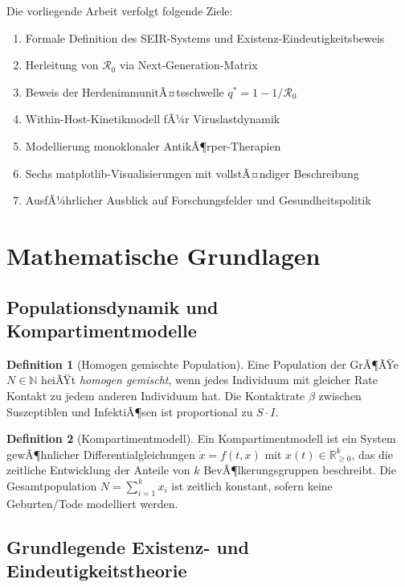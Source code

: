 ﻿\documentclass[12pt,a4paper]{article}
\theoremstyle{definition}
\newtheorem{definition}{Definition}[section]
\theoremstyle{plain}
\theoremstyle{remark}
\newcommand{\NN}{\mathbb{N}}
\newcommand{\RRR}{\mathbb{R}}
\begin{document}
Die vorliegende Arbeit verfolgt folgende Ziele:
\begin{enumerate}
  \item Formale Definition des SEIR-Systems und Existenz-Eindeutigkeitsbeweis
  \item Herleitung von $\mathcal{R}_0$ via Next-Generation-Matrix
  \item Beweis der HerdenimmunitÃ¤tsschwelle $q^* = 1 - 1/\mathcal{R}_0$
  \item Within-Host-Kinetikmodell fÃ¼r Viruslastdynamik
  \item Modellierung monoklonaler AntikÃ¶rper-Therapien
  \item Sechs matplotlib-Visualisierungen mit vollstÃ¤ndiger Beschreibung
  \item AusfÃ¼hrlicher Ausblick auf Forschungsfelder und Gesundheitspolitik
\end{enumerate}

\section{Mathematische Grundlagen}

\subsection{Populationsdynamik und Kompartimentmodelle}

\begin{definition}[Homogen gemischte Population]
Eine Population der GrÃ¶ÃŸe $N \in \NN$ heiÃŸt \emph{homogen gemischt}, wenn jedes
Individuum mit gleicher Rate Kontakt zu jedem anderen Individuum hat.
Die Kontaktrate $\beta$ zwischen Suszeptiblen und InfektiÃ¶sen ist proportional zu $S \cdot I$.
\end{definition}

\begin{definition}[Kompartimentmodell]
Ein Kompartimentmodell ist ein System gewÃ¶hnlicher Differentialgleichungen
$\dot{x} = f(t, x)$ mit $x(t) \in \RRR^k_{\geq 0}$, das die zeitliche Entwicklung
der Anteile von $k$ BevÃ¶lkerungsgruppen beschreibt.
Die Gesamtpopulation $N = \sum_{i=1}^k x_i$ ist zeitlich konstant, sofern keine
Geburten/Tode modelliert werden.
\end{definition}

\subsection{Grundlegende Existenz- und Eindeutigkeitstheorie}
\end{document}
